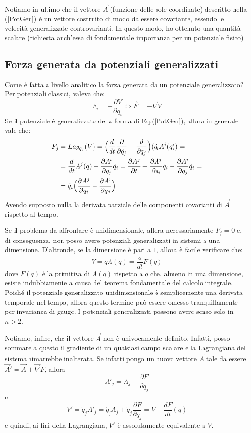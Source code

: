 \documentclass[a4paper,openany]{article}
\begin{document}
	Notiamo in ultimo che il vettore $\vec{A}$ (funzione delle sole coordinate) descritto nella (\ref{PotGen}) è un vettore costruito di modo da essere covariante, essendo le velocità generalizzate controvarianti. In questo modo, ho ottenuto una quantità scalare (richiesta anch'essa di fondamentale importanza per un potenziale fisico)
	\subsection{Forza generata da potenziali generalizzati}
	Come è fatta a livello analitico la forza generata da un potenziale generalizzato? Per potenziali classici, valeva che:
	$$
	F_i = - \dfrac{\partial V}{\partial q_i} \iff \vec{F} = -\vec{\nabla} V
	$$
	Se il potenziale è generalizzato della forma di Eq.(\ref{PotGen}), allora in generale vale che:
	\begin{equation}
		\begin{split}
			F_j &= Lag_{q_j}(V) = \Bigl(\dfrac{d}{dt}\dfrac{\partial}{\partial \dot{q}_j}-\dfrac{\partial}{\partial q_j}\Bigl) (\dot{q}_i A^{i}(q)) = \\
			&= \dfrac{d}{dt}A^j (q) - \dfrac{\partial A^i}{\partial q_j}\dot{q}_i = \dfrac{\partial A^j}{\partial t} + \dfrac{\partial A^j}{\partial q_i}\dot{q}_i - \dfrac{\partial A^i}{\partial q_j}\dot{q}_i = \\
			&= \dot{q}_i \Bigl(\dfrac{\partial A^j}{\partial q_i} -\dfrac{\partial A^i}{\partial q_j}\Bigl)
		\end{split}
		\label{ForzaGen}
	\end{equation}
	Avendo supposto nulla la derivata parziale delle componenti covarianti di $\vec{A}$ rispetto al tempo. 
	
	Se il problema da affrontare è unidimensionale, allora necessariamente $F_j = 0$ e, di conseguenza, non posso avere potenziali generalizzati in sistemi a una dimensione. D'altronde, se la dimensione è pari a $1$, allora è facile verificare che:
	$$
	V = \dot{q}A(q) = \dfrac{d}{dt}F(q)
	$$
	dove $F(q)$ è la primitiva di $A(q)$ rispetto a $q$ che, almeno in una dimensione, esiste indubbiamente a causa del teorema fondamentale del calcolo integrale. Poiché il potenziale generalizzato unidimensionale è semplicemente una derivata temporale nel tempo, allora questo termine può essere omesso tranquillamente per invarianza di gauge. I potenziali generalizzati possono avere senso solo in $n>2$.
	
	Notiamo, infine, che il vettore $\vec{A}$ non è univocamente definito. Infatti, posso sommare a questo il gradiente di un qualsiasi campo scalare e la Lagrangiana del sistema rimarrebbe inalterata. Se infatti pongo un nuovo vettore $\vec{A}$ tale da essere $\vec{A}' = \vec{A}+\vec{\nabla}F$, allora
	$$
	A'_j = A_j + \dfrac{\partial F}{\partial q_j}
	$$
	e
	$$
	V' = \dot{q}_j A'_j = \dot{q}_j A_j  + \dot{q}_j\dfrac{\partial F}{\partial q_j} = V + \dfrac{dF}{dt}(q)
	$$
	e quindi, ai fini della Lagrangiana, $V'$ è assolutamente equivalente a $V$.
\end{document}
